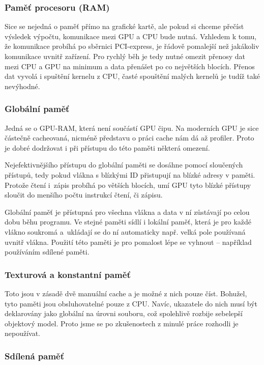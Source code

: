 \subsubsection{Paměť procesoru (RAM)}

Sice se nejedná o paměť přímo na grafické kartě, ale pokud si chceme přečíst výsledek výpočtu, komunikace mezi GPU a CPU bude nutná. Vzhledem k tomu, že komunikace probíhá po sběrnici PCI-express, je řádově pomalejší než jakákoliv komunikace uvnitř zařízení. Pro rychlý běh je tedy nutné omezit přenosy dat mezi CPU a GPU na minimum a data přenášet po co největších blocích. Přenos dat vyvolá i spuštění kernelu z CPU, časté spouštění malých kernelů je tudíž také nevýhodné.

\subsubsection{Globální paměť}

Jedná se o GPU-RAM, která není součástí GPU čipu. Na moderních GPU je sice částečně cacheovaná, nicméně představu o práci cache nám dá až profiler. Proto je dobré dodržovat i při přístupu do této paměti některá omezení.

Nejefektivnějšího přístupu do globální paměti se dosáhne pomocí sloučených přístupů, tedy pokud vlákna s blízkými ID přistupují na blízké adresy v paměti. Protože čtení i~zápis probíhá po větších blocích, umí GPU tyto blízké přístupy sloučit do menšího počtu instrukcí čtení, či zápisu.

Globální paměť je přístupná pro všechna vlákna a data v ní zůstávají po celou dobu běhu programu. Ve stejné paměti sídlí i lokální paměť, která je pro každé vlákno soukromá a~ukládají se do ní automaticky např. velká pole používaná uvnitř vlákna. Použití této paměti je pro pomalost lépe se vyhnout -- například používáním sdílené paměti.

\subsubsection{Texturová a konstantní paměť}

Toto jsou v zásadě dvě manuální cache a je možné z nich pouze číst. Bohužel, tyto paměti jsou obsluhovatelné pouze z CPU. Navíc, ukazatele do nich musí být deklarovány jako globální na úrovni souboru, což spolehlivě rozbije sebelepší objektový model. Proto jsme se po zkušenostech z minulé práce \cite{bakalarka} rozhodli je nepoužívat.

\subsubsection{Sdílená paměť}

